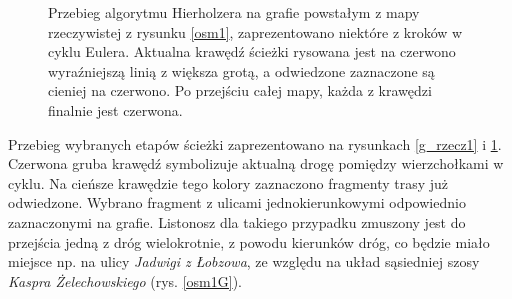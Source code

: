 \documentclass[a4paper, 12pt, twoside, openright]{article}
\begin{document}
\begin{figure}[!p]
	\centering
	\quad
	
	\caption[]{Przebieg algorytmu Hierholzera na grafie powstałym z mapy rzeczywistej z rysunku \ref{osm1}, zaprezentowano niektóre z kroków w cyklu Eulera. Aktualna krawędź ścieżki rysowana jest na czerwono wyraźniejszą linią z większa grotą, a odwiedzone zaznaczone są cieniej na czerwono. Po przejściu całej mapy, każda z krawędzi finalnie jest czerwona.}
	\label{g_rzecz2}
\end{figure}	

Przebieg wybranych etapów ścieżki zaprezentowano na rysunkach \ref{g_rzecz1} i \ref{g_rzecz2}. Czerwona gruba krawędź symbolizuje aktualną drogę pomiędzy wierzchołkami w cyklu. Na cieńsze krawędzie tego kolory zaznaczono fragmenty trasy już odwiedzone. Wybrano fragment z ulicami jednokierunkowymi odpowiednio zaznaczonymi na grafie. Listonosz dla takiego przypadku zmuszony jest do przejścia jedną z dróg wielokrotnie, z powodu kierunków dróg, co będzie miało miejsce np. na ulicy \textit{Jadwigi z Łobzowa}, ze względu na układ sąsiedniej szosy \textit{Kaspra Żelechowskiego} (rys. \ref{osm1G}).
\end{document}
